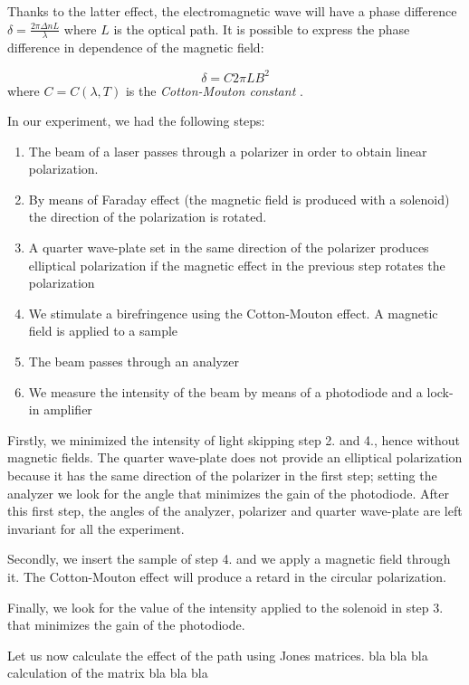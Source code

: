 \documentclass[11pt,a4paper]{article}
\begin{document}
Thanks to the latter effect, the electromagnetic wave will have a phase difference $\delta=\frac{2\pi \Delta n L}{\lambda}$ where $L$ is the optical path. It is possible to express the phase difference in dependence of the magnetic field:

\begin{equation}
\delta=C2\pi L B^2
\end{equation}
where $C=C(\lambda,T)$ is the \emph{Cotton-Mouton constant} \cite{wilson1997simple}.
	
In our experiment, we had the following steps:

\begin{enumerate}
\item The beam of a laser passes through a polarizer in order to obtain linear polarization.
\item By means of Faraday effect (the magnetic field is produced with a solenoid) the direction of the polarization is rotated.
\item A quarter wave-plate set in the same direction of the polarizer produces elliptical polarization if the magnetic effect in the previous step rotates the polarization
\item We stimulate a birefringence using the Cotton-Mouton effect. A magnetic field is applied to a sample
\item The beam passes through an analyzer
\item We measure the intensity of the beam by means of a photodiode and a lock-in amplifier
\end{enumerate}	

Firstly, we minimized the intensity of light skipping step 2. and 4., hence without magnetic fields.  The quarter wave-plate does not provide an elliptical polarization because it has the same direction of the polarizer in the first step; setting the analyzer we look for the angle that minimizes the gain of the photodiode. After this first step, the angles of the analyzer, polarizer and quarter wave-plate are left invariant for all the experiment.

Secondly, we insert the sample of step 4. and we apply a magnetic field through it. The Cotton-Mouton effect will produce a retard in the circular polarization. 

Finally, we look for the value of the intensity applied to the solenoid in step 3. that minimizes the gain of the photodiode. 

Let us now calculate the effect of the path using Jones matrices. bla bla bla calculation of the matrix bla bla bla
\end{document}

